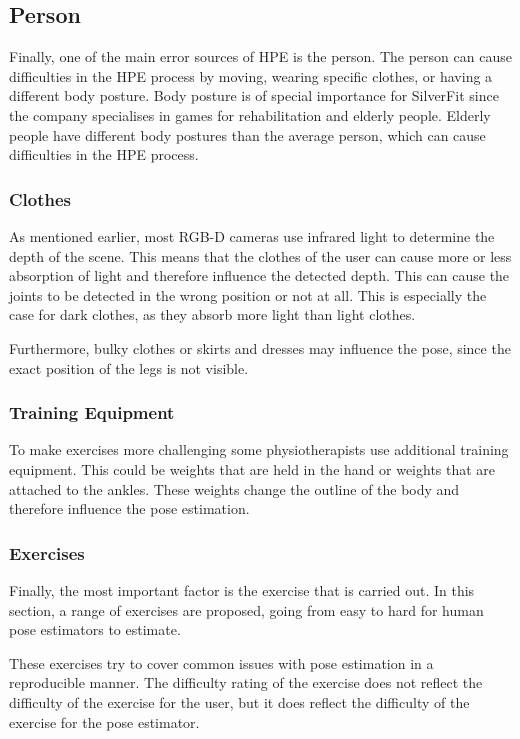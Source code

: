 \subsection{Person}

Finally, one of the main error sources of HPE is the person. The person can cause difficulties in the HPE process by moving, wearing specific clothes, or having a different body posture. Body posture is of special importance for SilverFit since the company specialises in games for rehabilitation and elderly people. Elderly people have different body postures than the average person, which can cause difficulties in the HPE process.

\subsubsection{Clothes}

As mentioned earlier, most RGB-D cameras use infrared light to determine the depth of the scene. This means that the clothes of the user can cause more or less absorption of light and therefore influence the detected depth. This can cause the joints to be detected in the wrong position or not at all. This is especially the case for dark clothes, as they absorb more light than light clothes.

Furthermore, bulky clothes or skirts and dresses may influence the pose, since the exact position of the legs is not visible.

\subsubsection{Training Equipment}

To make exercises more challenging some physiotherapists use additional training equipment. This could be weights that are held in the hand or weights that are attached to the ankles. These weights change the outline of the body and therefore influence the pose estimation. 

\subsubsection{Exercises}
\label{sec:exercises}

Finally, the most important factor is the exercise that is carried out. In this section, a range of exercises are proposed, going from easy to hard for human pose estimators to estimate.

These exercises try to cover common issues with pose estimation in a reproducible manner. The difficulty rating of the exercise does not reflect the difficulty of the exercise for the user, but it does reflect the difficulty of the exercise for the pose estimator.

